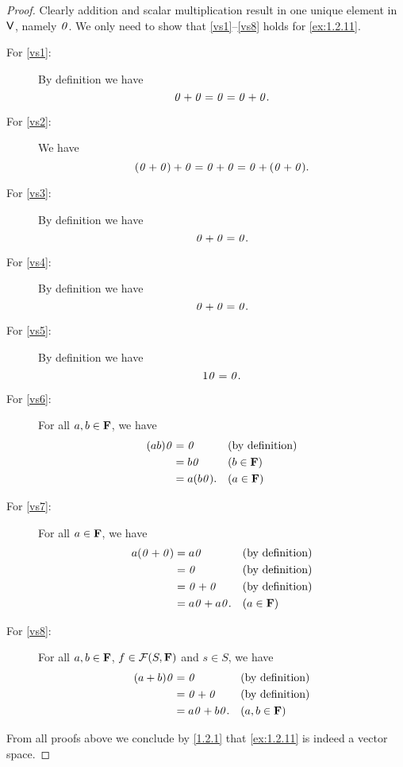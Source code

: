 \begin{proof}
    Clearly addition and scalar multiplication result in one unique element in \(\mathsf{V}\), namely \(\mathit{0}\).
    We only need to show that \ref{vs1}--\ref{vs8} holds for \cref{ex:1.2.11}.
    \begin{description}
        \item[For \ref{vs1}:]
            By definition we have
            \[
                \mathit{0} + \mathit{0} = \mathit{0} = \mathit{0} + \mathit{0}.
            \]
        \item[For \ref{vs2}:]
            We have
            \[
                \p{\zv + \zv} + \zv = \zv + \zv = \zv + \p{\zv + \zv}.
            \]
        \item[For \ref{vs3}:]
            By definition we have
            \[
                \mathit{0} + \mathit{0} = \mathit{0}.
            \]
        \item[For \ref{vs4}:]
            By definition we have
            \[
                \mathit{0} + \mathit{0} = \mathit{0}.
            \]
        \item[For \ref{vs5}:]
            By definition we have
            \[
                1\mathit{0} = \mathit{0}.
            \]
        \item[For \ref{vs6}:]
            For all \(a, b \in \mathbf{F}\), we have
            \begin{align*}
                \p{ab} \zv & = \zv        &  & \text{(by definition)} \\
                           & = b\zv       &  & (b \in \F)             \\
                           & = a\p{b\zv}. &  & (a \in \F)
            \end{align*}
        \item[For \ref{vs7}:]
            For all \(a \in \mathbf{F}\), we have
            \begin{align*}
                a\p{\zv + \zv} & = a\zv         &  & \text{(by definition)} \\
                               & = \zv          &  & \text{(by definition)} \\
                               & = \zv + \zv    &  & \text{(by definition)} \\
                               & = a\zv + a\zv. &  & (a \in \F)
            \end{align*}
        \item[For \ref{vs8}:]
            For all \(a, b \in \mathbf{F}\), \(f \in \mathcal{F}\p{S, \F}\) and \(s \in S\), we have
            \begin{align*}
                \p{a + b} \zv & = \zv          &  & \text{(by definition)} \\
                              & = \zv + \zv    &  & \text{(by definition)} \\
                              & = a\zv + b\zv. &  & (a, b \in \F)
            \end{align*}
    \end{description}
    From all proofs above we conclude by \cref{1.2.1} that \cref{ex:1.2.11} is indeed a vector space.
\end{proof}

